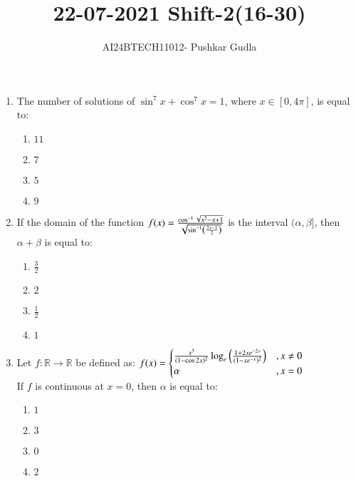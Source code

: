 \documentclass[journal,12pt,onecolumn]{IEEEtran}
\theoremstyle{remark}
\begin{document}

\vspace{3cm}

\title{\textbf{22-07-2021 Shift-2(16-30)}}
\author{AI24BTECH11012- Pushkar Gudla}
\maketitle
\bigskip

\renewcommand{\thefigure}{\theenumi}
\renewcommand{\thetable}{\theenumi}
\setlength{\columnsep}{2.5em}

\begin{enumerate}
    \item The number of solutions of $ \sin^7 x + \cos^7 x = 1 $, where $ x \in [0, 4\pi] $, is equal to:
    \begin{enumerate}
        \item $11$
        \item $7$
        \item $5$
        \item $9$
    \end{enumerate}

    \item If the domain of the function $f(x) = \frac{\cos^{-1}\sqrt{x^2 - x + 1}}{\sqrt{\sin^{-1}\left(\frac{2x-1}{2}\right)}}$ is the interval $ (\alpha, \beta] $, then $ \alpha + \beta $ is equal to:
    \begin{enumerate}
        \item $ \frac{3}{2} $
        \item $2$
        \item $ \frac{1}{2} $
        \item $1$
    \end{enumerate}

    \item Let $ f : \mathbb{R} \to \mathbb{R} $ be defined as:
    $f(x) =
    \begin{cases}
        \frac{x^3}{(1-\cos 2x)^2}\log_e\left(\frac{1+2xe^{-2x}}{(1-xe^{-x})^2}\right) & , x \neq 0 \\
        \alpha & , x = 0
    \end{cases}$\\
    If $ f $ is continuous at $ x = 0 $, then $ \alpha $ is equal to:
    \begin{enumerate}
        \item $1$
        \item $3$
        \item $0$
        \item $2$
    \end{enumerate}


\end{enumerate}
\end{document}
